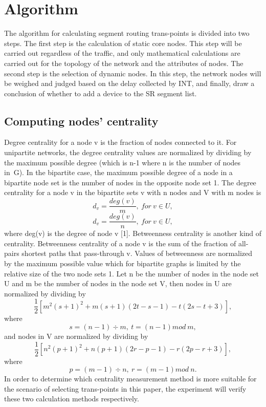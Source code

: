 \documentclass[conference]{IEEEtran}
\begin{document}
\section{Algorithm}
The algorithm for calculating segment routing trans-points is divided into two steps. The first step is the calculation of static core nodes. This step will be carried out regardless of the traffic, and only mathematical calculations are carried out for the topology of the network and the attributes of nodes. The second step is the selection of dynamic nodes. In this step, the network nodes will be weighed and judged based on the delay collected by INT, and finally, draw a conclusion of whether to add a device to the SR segment list.

\subsection{Computing nodes’ centrality}\label{AA}
Degree centrality for a node v is the fraction of nodes connected to it. For unipartite networks, the degree centrality values are normalized by dividing by the maximum possible degree (which is n-1 where n is the number of nodes in\ G). In the bipartite case, the maximum possible degree of a node in a bipartite node set is the number of nodes in the opposite node set 1. The degree centrality for a node v in the bipartite sets v with n nodes and V with m nodes is
\begin{equation}
d_v=\frac{deg(v)}{m},\ for\ v\in U,
\end{equation}
\begin{equation}
d_v=\frac{deg(v)}{n},\ for\ v\in U,
\end{equation}
where deg(v) is the degree of node v [1].
Betweenness centrality is another kind of centrality. Betweenness centrality of a node v is the sum of the fraction of all-pairs shortest paths that pass-through v. Values of betweenness are normalized by the maximum possible value which for bipartite graphs is limited by the relative size of the two node sets 1. Let n be the number of nodes in the node set U and m be the number of nodes in the node set V, then nodes in U are normalized by dividing by
\begin{equation}
\frac{1}{2}[m^2{(s+1)}^2+m(s+1)(2t-s-1)-t(2s-t+3)],
\end{equation}
where
\begin{equation}
s=(n-1)\div m,\ t=(n-1)mod\ m,
\end{equation}
and nodes in V are normalized by dividing by
\begin{equation}
\frac{1}{2}[n^2{(p+1)}^2+n(p+1)(2r-p-1)-r(2p-r+3)],
\end{equation}
where
\begin{equation}
p=(m-1)\div n,\ r=(m-1)mod\ n.
\end{equation}
In order to determine which centrality measurement method is more suitable for the scenario of selecting trans-points in this paper, the experiment will verify these two calculation methods respectively.
\end{document}
